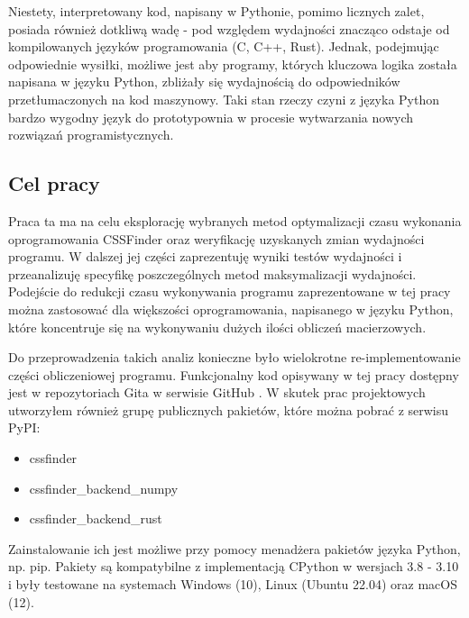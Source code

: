 \documentclass[11pt, a4paper]{article}
\begin{document}
\begin{sloppypar}
    Niestety, interpretowany kod, napisany w Pythonie, pomimo licznych zalet, posiada
    również dotkliwą wadę - pod względem wydajności znacząco odstaje od kompilowanych
    języków programowania (C\cite{C_vs_Python}, C++\cite{Cpp_vs_Python}, Rust\cite{Rust_vs_Python}).
    Jednak, podejmując odpowiednie wysiłki, możliwe jest aby programy, których kluczowa logika
    została napisana w języku Python, zbliżały się wydajnością do odpowiedników
    przetłumaczonych na kod maszynowy. Taki stan rzeczy czyni z języka Python bardzo wygodny
    język do prototypownia w procesie wytwarzania nowych rozwiązań programistycznych.

    \subsection{Cel pracy}


    Praca ta ma na celu eksplorację wybranych metod optymalizacji czasu wykonania oprogramowania
    CSSFinder oraz weryfikację uzyskanych zmian wydajności programu. W dalszej jej
    części zaprezentuję wyniki testów wydajności i przeanalizuję specyfikę
    poszczególnych metod maksymalizacji wydajności. Podejście do redukcji czasu wykonywania
    programu zaprezentowane w tej pracy można zastosować dla większości oprogramowania,
    napisanego w języku Python, które koncentruje się na wykonywaniu dużych ilości obliczeń
    macierzowych.

    Do przeprowadzenia takich analiz konieczne było wielokrotne re-implementowanie części
    obliczeniowej programu. Funkcjonalny kod opisywany w tej pracy dostępny jest w
    repozytoriach Gita\cite{Git_Com} w serwisie GitHub \cite{CSSFinder_New}\cite{CSSFinder_New_Numpy}\cite{CSSFinder_New_Rust}.
    W skutek prac projektowych utworzyłem również grupę publicznych pakietów, które można
    pobrać z serwisu PyPI:

    \begin{itemize}
      \item cssfinder\cite{CSSFinder_New_PyPI}

      \item cssfinder\_backend\_numpy\cite{CSSFinder_New_Numpy_PyPI}

      \item cssfinder\_backend\_rust\cite{CSSFinder_New_Rust_PyPI}
    \end{itemize}

    Zainstalowanie ich jest możliwe przy pomocy menadżera pakietów języka Python, np.
    pip\cite{PIP}. Pakiety są kompatybilne z implementacją CPython w wersjach 3.8 - 3.10
    i były testowane na systemach Windows (10), Linux (Ubuntu 22.04) oraz macOS (12).


\end{sloppypar}
\end{document}
